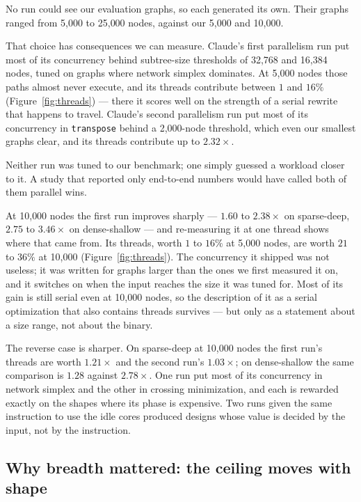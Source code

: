No run could see our evaluation graphs, so each generated its own. Their graphs
ranged from 5{,}000 to 25{,}000 nodes, against our 5{,}000 and 10{,}000.

That choice has consequences we can measure. Claude's first parallelism run put
most of its concurrency behind subtree-size thresholds of 32{,}768 and 16{,}384 nodes,
tuned on graphs where network simplex dominates. At 5{,}000 nodes those paths
almost never execute, and its threads contribute between $1$ and $16\%$
(Figure~\ref{fig:threads}) --- there it scores well on the strength of a serial
rewrite that happens to travel. Claude's second parallelism run put most of its
concurrency in \texttt{transpose} behind a 2{,}000-node threshold, which even our
smallest graphs clear, and its threads contribute up to $2.32\times$.

Neither run was tuned to our benchmark; one simply guessed a workload closer to
it. A study that reported only end-to-end numbers would have called both of them
parallel wins.

At 10{,}000 nodes the first run improves sharply --- $1.60$ to $2.38\times$ on
sparse-deep, $2.75$ to $3.46\times$ on dense-shallow --- and re-measuring it at
one thread shows where that came from. Its threads, worth $1$ to $16\%$ at
5{,}000 nodes, are worth $21$ to $36\%$ at 10{,}000
(Figure~\ref{fig:threads}). The concurrency it shipped was not useless; it was
written for graphs larger than the ones we first measured it on, and it switches
on when the input reaches the size it was tuned for. Most of its gain is still
serial even at 10{,}000 nodes, so the description of it as a serial optimization
that also contains threads survives --- but only as a statement about a size
range, not about the binary.

The reverse case is sharper. On sparse-deep at 10{,}000 nodes the first run's
threads are worth $1.21\times$ and the second run's $1.03\times$; on
dense-shallow the same comparison is $1.28$ against $2.78\times$. One run put
most of its concurrency in network simplex and the other in crossing minimization, and
each is rewarded exactly on the shapes where its phase is expensive. Two runs
given the same instruction to use the idle cores produced designs whose value is
decided by the input, not by the instruction.

\subsection{Why breadth mattered: the ceiling moves with shape}

